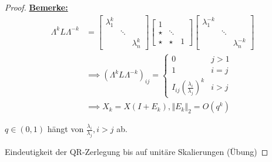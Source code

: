 \documentclass{book}
\begin{document}
            \begin{proof}

                \underline{\textbf{Bemerke:}} 
                \begin{align*}
                    \Lambda^k L \Lambda^{-k}&=\begin{bmatrix}
                        \lambda_1^k & & \\
                        & \ddots & \\
                        &&\lambda_n^k
                    \end{bmatrix}
                    \begin{bmatrix}
                            1 & & \\
                            \star& \ddots & \\
                            \star &\star &1
                    \end{bmatrix}
                    \begin{bmatrix}
                        \lambda_1^{-k} & & \\
                        & \ddots & \\
                        &&\lambda_n^{-k}
                    \end{bmatrix}\\
                    &\implies \left(\Lambda^k L \Lambda^{-k}\right)_{ij}=\begin{cases}
                        0 & j>1\\
                        1 & i=j\\
                        I_{ij}\left(\frac{\lambda_i}{\lambda_j}\right)^k & i>j
                    \end{cases}\\
                    &\implies X_k=X(I+E_k), \left\Vert E_k \right\Vert_2=O(q^k) 
                \end{align*}

                $q\in(0,1)$ hängt von $\frac{\lambda_i}{\lambda_j},i>j$ ab.

                Eindeutigkeit der QR-Zerlegung bis auf unitäre Skalierungen (Übung)


\end{proof}
\end{document}
